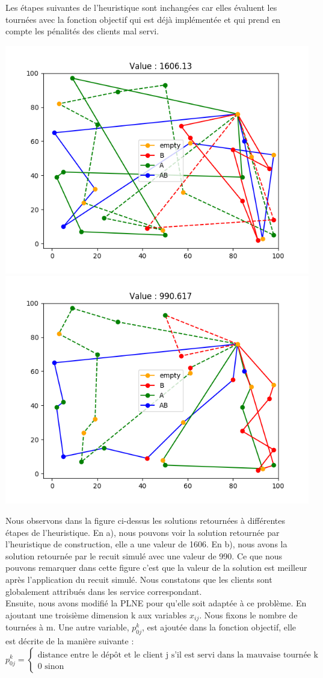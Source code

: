 Les étapes suivantes de l'heuristique sont inchangées car elles évaluent les tournées avec la fonction objectif qui est déjà implémentée et qui prend en compte les pénalités des clients mal servi.
 \newpage
\begin{center}
\includegraphics[width=0.49\linewidth]{pictures/image4.png}
\includegraphics[width=0.49\linewidth]{pictures/image6.png}
\end{center}

Nous observons dans la figure ci-dessus les solutions retournées à différentes étapes de l'heuristique. En a), nous pouvons voir la solution retournée par l'heuristique de construction, elle a une valeur de 1606. En b), nous avons la solution retournée par le recuit simulé avec une valeur de 990. Ce que nous pouvons remarquer dans cette figure c'est que la valeur de la solution est meilleur après l'application du recuit simulé. Nous constatons que les clients sont globalement attribués dans les service correspondant.
\\

Ensuite, nous avons modifié la PLNE pour qu'elle soit adaptée à ce problème. En ajoutant une troisième dimension k aux variables $x_{ij}$. Nous fixons le nombre de tournées à m. Une autre variable, $p^k_{0j}$, est ajoutée dans la fonction objectif, elle est décrite de la manière suivante :
\[
p^k_{0j} =
\begin{cases}
\text{distance entre le dépôt et le client j s'il est servi dans la mauvaise tournée k}\\
0 \text{ sinon}
\end{cases}
\]
\newpage

